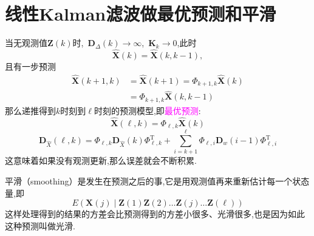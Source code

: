 \documentclass[cn,10pt,citestyle=gb7714-2015,bibstyle=gb7714-2015]{elegantbook}
\newcommand{\mT}{\mathrm{T}}
\renewcommand{\l}{\ell}
\begin{document}
\section{线性Kalman滤波做最优预测和平滑}\label{sec:Kalman-predict-smooth}
当无观测值$\bm{Z}(k)$时,\ $\bm{D}_\varDelta(k)\to\infty$,\ $\bm{K}_k\to 0$,此时
\[
  \hat{\bm{X}}(k)=\hat{\bm{X}}(k,k-1),
\]
且有一步预测
\begin{align*}
  \hat{\bm{X}}(k+1,k)&=\hat{\bm{X}}(k+1)=\bm{\varPhi}_{k+1,k}\hat{\bm{X}}(k)\\
  &=\bm{\varPhi}_{k+1,k}\hat{\bm{X}}(k,k-1)
\end{align*}
那么递推得到$k$时刻到$\l$时刻的预测模型,即\textcolor{magenta}{最优预测}:
\begin{equation}
  \hat{\bm{X}}(\l,k)=\bm{\varPhi}_{\l,k}\hat{\bm{X}}(k)
\end{equation}
\begin{equation}
  \bm{D}_{\hat{X}}(\l,k)=\bm{\varPhi}_{\l,k}\bm{D}_{\hat{X}}(k)\bm{\varPhi}_{\l,k}^\mT+\sum_{i=k+1}^\l\bm{\varPhi}_{\l,i}\bm{D}_w(i-1)\bm{\varPhi}_{\l,i}^\mT
\end{equation}
这意味着如果没有观测更新,那么误差就会不断积累.

平滑（smoothing）是发生在预测之后的事,它是用观测值再来重新估计每一个状态量,即
\[
  E\left(\bm{X}(j)\mid\bm{Z}(1)\bm{Z}(2)\ldots\bm{Z}(j)\ldots\bm{Z}(\l)\right)
\]
这样处理得到的结果的方差会比预测得到的方差小很多、光滑很多,也是因为如此这种预测叫做光滑.
\end{document}
